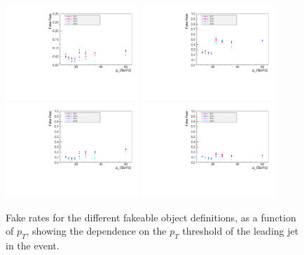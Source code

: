 \begin{figure}[!htbp]
\begin{center}
\includegraphics[width=0.45\textwidth]{figures/ElectronFakeRate_DenominatorV1_Ele8CaloIdLCaloIsoVLSample_Pt.pdf}
\includegraphics[width=0.45\textwidth]{figures/ElectronFakeRate_DenominatorV2_Ele8CaloIdLCaloIsoVLSample_Pt.pdf}
\includegraphics[width=0.45\textwidth]{figures/ElectronFakeRate_DenominatorV3_Ele8CaloIdLCaloIsoVLSample_Pt.pdf}
\includegraphics[width=0.45\textwidth]{figures/ElectronFakeRate_DenominatorV4_Ele8CaloIdLCaloIsoVLSample_Pt.pdf}
\caption{Fake rates for the different fakeable object definitions, as a function of $p_T$, showing
the dependence on the $p_{T}$ threshold of the leading jet in the event.}
\label{fig:ele_fr_jetPtThresholdDependence}
\end{center}
\end{figure}


